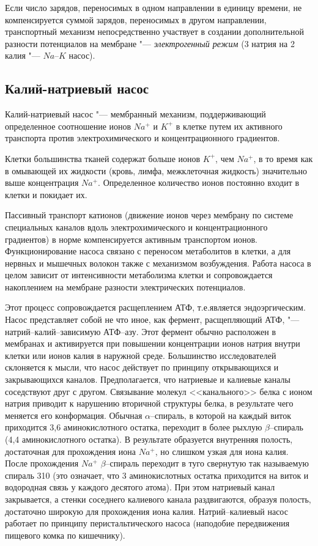 \documentclass[12pt,a4paper,oneside]{book}
\begin{document}
Если число зарядов, переносимых в одном направлении в единицу времени, не компенсируется суммой зарядов, переносимых в другом направлении, транспортный механизм непосредственно участвует в создании дополнительной разности потенциалов на мембране "--- {\it электрогенный режим} (3 натрия на 2 калия "--- $Na$--$K$ насос).


\subsection{Калий-натриевый насос}

Калий-натриевый насос "--- мембранный механизм, поддерживающий определенное соотношение ионов $Na^+$ и $K^+$ в клетке путем их активного транспорта против электрохимического и концентрационного градиентов.

Клетки большинства тканей содержат больше ионов $K^+$, чем $Na^+$, в то время как в омывающей их жидкости (кровь, лимфа, межклеточная жидкость) значительно выше концентрация $Na^+$. Определенное количество ионов постоянно входит в клетки и покидает их. 

Пассивный транспорт катионов (движение ионов через мембрану по системе специальных каналов вдоль электрохимического и концентрационного градиентов) в норме компенсируется активным транспортом ионов. Функционирование насоса связано с переносом метаболитов в клетки, а для нервных и мышечных волокон также с механизмом возбуждения. Работа насоса в целом зависит от интенсивности метаболизма клетки и сопровождается накоплением на мембране разности электрических потенциалов.

Этот процесс сопровождается расщеплением АТФ, т.е.является эндоэргическим. Насос представляет собой не что иное, как фермент, расщепляющий АТФ, "--- натрий--калий--зависимую АТФ--азу. Этот фермент обычно расположен в мембранах и активируется при повышении концентрации ионов натрия внутри клетки или ионов калия в наружной среде. Большинство исследователей склоняется к мысли, что насос действует по принципу открывающихся и закрывающихся каналов. Предполагается, что натриевые и калиевые каналы соседствуют друг с другом. Связывание молекул <<канального>> белка с ионом натрия приводит к нарушению вторичной структуры белка, в результате чего меняется его конформация. Обычная $\alpha$--спираль, в которой на каждый виток приходится 3,6 аминокислотного остатка, переходит в более рыхлую $\beta$--спираль (4,4 аминокислотного остатка). В результате образуется внутренняя полость, достаточная для прохождения иона $Na^+$, но слишком узкая для иона калия. После прохождения $Na^+$ $\beta$--спираль переходит в туго свернутую так называемую спираль 310 (это означает, что 3 аминокислотных остатка приходится на виток и водородная связь у каждого десятого атома). При этом натриевый канал закрывается, а стенки соседнего калиевого канала раздвигаются, образуя полость, достаточно широкую для прохождения иона калия. Натрий--калиевый насос работает по принципу перистальтического насоса (наподобие передвижения пищевого комка по кишечнику).
\end{document}
